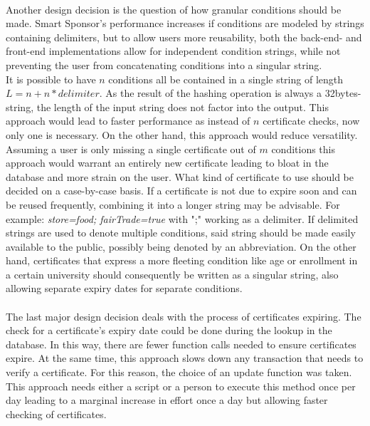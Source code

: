 \\
Another design decision is the question of how granular conditions should be made.
Smart Sponsor's performance increases if conditions are modeled by strings containing delimiters, but to allow users more reusability, both the back-end- and front-end implementations allow for independent condition strings, while not preventing the user from concatenating conditions into a singular string. \\
It is possible to have $n$ conditions all be contained in a single string of length $L = n + n*delimiter$. As the result of the hashing operation is always a 32bytes-string, the length of the input string does not factor into the output. This approach would lead to faster performance as instead of $n$ certificate checks, now only one is necessary. On the other hand, this approach would reduce versatility. Assuming a user is only missing a single certificate out of $m$ conditions this approach would warrant an entirely new certificate leading to bloat in the database and more strain on the user. What kind of certificate to use should be decided on a case-by-case basis. If a certificate is not due to expire soon and can be reused frequently, combining it into a longer string may be advisable. For example: \emph{store=food; fairTrade=true} with ";" working as a delimiter. If delimited strings are used to denote multiple conditions, said string should be made easily available to the public, possibly being denoted by an abbreviation. On the other hand, certificates that express a more fleeting condition like age or enrollment in a certain university should consequently be written as a singular string, also allowing separate expiry dates for separate conditions.\\
\\
The last major design decision deals with the process of certificates expiring. The check for a certificate's expiry date could be done during the lookup in the database. In this way, there are fewer function calls needed to ensure certificates expire. At the same time, this approach slows down any transaction that needs to verify a certificate. For this reason, the choice of an update function was taken. This approach needs either a script or a person to execute this method once per day leading to a marginal increase in effort once a day but allowing faster checking of certificates.

